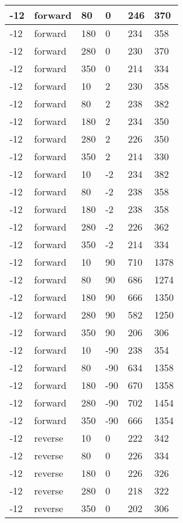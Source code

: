\begin{longtable}{|l|l|l|l|l|l|}
			-12 & forward & 80 & 0 & 246 & 370 \\
			\hline
			-12 & forward & 180 & 0 & 234 & 358 \\
			\hline
			-12 & forward & 280 & 0 & 230 & 370 \\
			\hline
			-12 & forward & 350 & 0 & 214 & 334 \\
			\hline
			-12 & forward & 10 & 2 & 230 & 358 \\
			\hline
			-12 & forward & 80 & 2 & 238 & 382 \\
			\hline
			-12 & forward & 180 & 2 & 234 & 350 \\
			\hline
			-12 & forward & 280 & 2 & 226 & 350 \\
			\hline
			-12 & forward & 350 & 2 & 214 & 330 \\
			\hline
			-12 & forward & 10 & -2 & 234 & 382 \\
			\hline
			-12 & forward & 80 & -2 & 238 & 358 \\
			\hline
			-12 & forward & 180 & -2 & 238 & 358 \\
			\hline
			-12 & forward & 280 & -2 & 226 & 362 \\
			\hline
			-12 & forward & 350 & -2 & 214 & 334 \\
			\hline
			-12 & forward & 10 & 90 & 710 & 1378 \\
			\hline
			-12 & forward & 80 & 90 & 686 & 1274 \\
			\hline
			-12 & forward & 180 & 90 & 666 & 1350 \\
			\hline
			-12 & forward & 280 & 90 & 582 & 1250 \\
			\hline
			-12 & forward & 350 & 90 & 206 & 306 \\
			\hline
			-12 & forward & 10 & -90 & 238 & 354 \\
			\hline
			-12 & forward & 80 & -90 & 634 & 1358 \\
			\hline
			-12 & forward & 180 & -90 & 670 & 1358 \\
			\hline
			-12 & forward & 280 & -90 & 702 & 1454 \\
			\hline
			-12 & forward & 350 & -90 & 666 & 1354 \\
			\hline
			-12 & reverse & 10 & 0 & 222 & 342 \\
			\hline
			-12 & reverse & 80 & 0 & 226 & 334 \\
			\hline
			-12 & reverse & 180 & 0 & 226 & 326 \\
			\hline
			-12 & reverse & 280 & 0 & 218 & 322 \\
			\hline
			-12 & reverse & 350 & 0 & 202 & 306 \\

\end{longtable}
